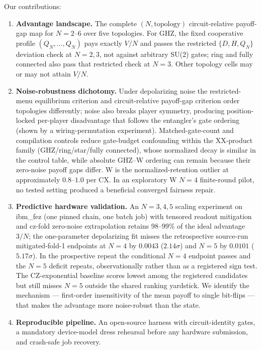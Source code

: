 \documentclass[conference]{IEEEtran}
\begin{document}
Our contributions:
\begin{enumerate}
  \item \textbf{Advantage landscape.} The complete $(N,\text{topology})$
  circuit-relative payoff-gap map for $N=2$--$6$ over five topologies. For
  GHZ, the fixed cooperative profile $(Q_N,\dots,Q_N)$ pays exactly $V/N$ and
  passes the restricted $\{D,H,Q_N\}$ deviation check at $N=2,3$, not against
  arbitrary SU(2) gates; ring and fully connected also pass that restricted
  check at $N=3$. Other topology cells may or may not attain $V/N$.
  \item \textbf{Noise-robustness dichotomy.} Under depolarizing noise the
  restricted-menu equilibrium criterion and circuit-relative payoff-gap
  criterion order topologies differently; noise also breaks player symmetry,
  producing position-locked per-player disadvantage that follows the
  entangler's gate ordering (shown by a wiring-permutation experiment).
  Matched-gate-count and compilation controls reduce gate-budget confounding
  within the XX-product family (GHZ/ring/star/fully connected), whose
  normalized decay is similar in the control table, while absolute GHZ--W
  ordering can remain because their zero-noise payoff gaps differ. W is the
  normalized-retention outlier at approximately $0.8$--$1.0$ per CX. In an
  exploratory W $N{=}4$ finite-round pilot, no tested setting produced a
  beneficial converged fairness repair.
  \item \textbf{Predictive hardware validation.} An $N=3,4,5$ scaling
  experiment on ibm\_fez (one pinned chain, one batch job) with tensored
  readout mitigation and cz-fold zero-noise extrapolation retains
  98--99\% of the ideal advantage $3/N$; the one-parameter depolarizing fit
  misses the retrospective source-run mitigated-fold-1 endpoints at $N{=}4$
  by $0.0043$ ($2.14\sigma$) and $N{=}5$ by $0.0101$ ($5.17\sigma$). In the
  prospective repeat the conditional $N{=}4$ endpoint passes and the $N{=}5$
  deficit repeats, observationally rather than as a registered sign test. The
  CZ-exponential baseline scores lowest among the registered candidates but
  still misses $N{=}5$ outside the shared ranking yardstick. We identify the
  mechanism --- first-order insensitivity of the mean payoff to single
  bit-flips --- that makes the advantage more noise-robust than the state.
  \item \textbf{Reproducible pipeline.} An open-source harness with
  circuit-identity gates, a mandatory device-model dress rehearsal before any
  hardware submission, and crash-safe job recovery.
\end{enumerate}
\end{document}
